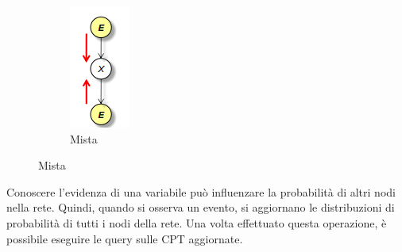 \begin{figure}[!ht]
\begin{subfigure}[b]{0.14\textwidth}
        \includegraphics[width=\textwidth]{./img/Reti/Mista.png}
        \caption{Mista}
        \label{fig:mista}
    \end{subfigure}
\end{figure}
Conoscere l'evidenza di una variabile può influenzare la probabilità di altri nodi
nella rete. Quindi, quando si osserva un evento, si aggiornano le distribuzioni
di probabilità di tutti i nodi della rete. Una volta effettuato questa operazione,
è possibile eseguire le query sulle CPT aggiornate.

